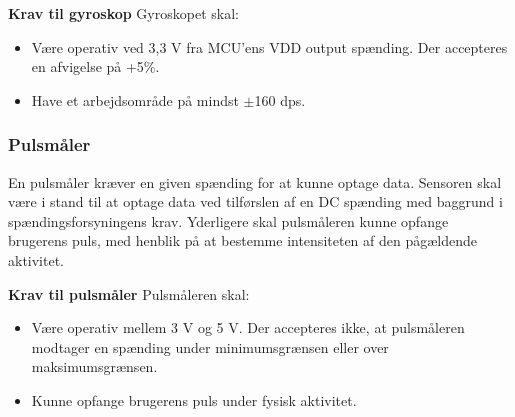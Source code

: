 \textbf{Krav til gyroskop} \newline
Gyroskopet skal:
\begin{itemize}
\item Være operativ ved 3,3 V fra MCU'ens VDD output spænding. Der accepteres en afvigelse på +5\%.
\item Have et arbejdsområde på mindst $\pm$160 dps.
\end{itemize}

\subsubsection{Pulsmåler}
En pulsmåler kræver en given spænding for at kunne optage data. Sensoren skal være i stand til at optage data ved tilførslen af en DC spænding med baggrund i spændingsforsyningens krav. Yderligere skal pulsmåleren kunne opfange brugerens puls, med henblik på at bestemme intensiteten af den pågældende aktivitet.

\textbf{Krav til pulsmåler} \newline
Pulsmåleren skal:
\begin{itemize}
\item Være operativ mellem 3 V og 5 V. Der accepteres ikke, at pulsmåleren modtager en spænding under minimumsgrænsen eller over maksimumsgrænsen.
\item Kunne opfange brugerens puls under fysisk aktivitet.
\end{itemize}
%
